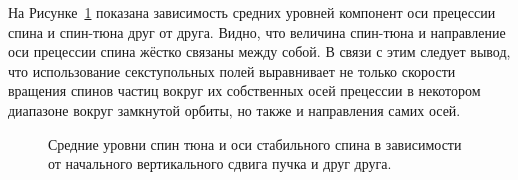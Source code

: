 На Рисунке~\ref{fig:mean_tune_axis} показана зависимость средних уровней компонент оси прецессии спина и спин-тюна друг от друга. Видно, что величина спин-тюна и направление оси прецессии спина жёстко связаны между собой. В связи с этим следует вывод, что использование секступольных полей выравнивает не только скорости вращения спинов частиц вокруг их собственных осей прецессии в некотором диапазоне вокруг замкнутой орбиты, но также и направления самих осей. 
\begin{figure}[h!]
	\centering\hfill
	\hfill
	\hfill
	\caption{Средние уровни спин тюна и оси стабильного спина в зависимости от начального вертикального сдвига пучка и друг друга.\label{fig:mean_tune_axis}}
\end{figure}


